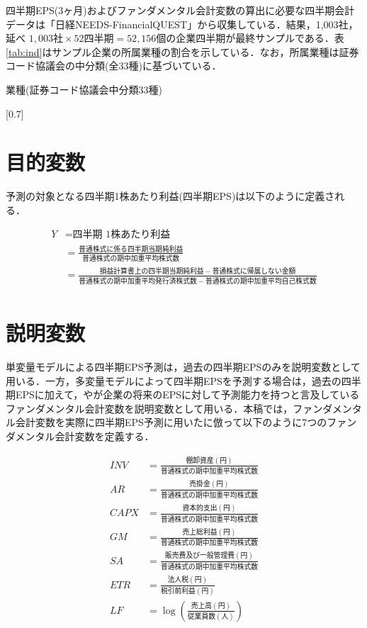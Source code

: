 \documentclass[a4paper，12pt]{jsarticle}
\begin{document}
四半期EPS(3ヶ月)およびファンダメンタル会計変数の算出に必要な四半期会計データは「日経NEEDS-FinancialQUEST」から収集している．結果，1,003社，延べ $1,003社 \times 52四半期 = 52,156個$の企業四半期が最終サンプルである．表\ref{tab:ind}はサンプル企業の所属業種の割合を示している．なお，所属業種は証券コード協議会の中分類(全33種)に基づいている．

\begin{table}
  \centering
  \caption{業種(証券コード協議会中分類33種)}
  \label{tab:ind}
  \scalebox{0.7}[0.7]{
    
  }
\end{table}

\section{目的変数}

予測の対象となる四半期1株あたり利益(四半期EPS)は以下のように定義される．

\begin{equation}
  \begin{split}
    Y &= \text{四半期 1株あたり利益} \\
    &= \frac{普通株式に係る四半期当期純利益}{普通株式の期中加重平均株式数} \\
    &= \frac{損益計算書上の四半期当期純利益-普通株式に帰属しない金額}{普通株式の期中加重平均発行済株式数 - 普通株式の期中加重平均自己株式数} \\  
  \end{split}
\end{equation}

\section{説明変数}

単変量モデルによる四半期EPS予測は，過去の四半期EPSのみを説明変数として用いる．一方，多変量モデルによって四半期EPSを予測する場合は，過去の四半期EPSに加えて，\cite{lev1993fundamental}や\cite{abarbanell1997fundamental}が企業の将来のEPSに対して予測能力を持つと言及しているファンダメンタル会計変数を説明変数として用いる．本稿では，ファンダメンタル会計変数を実際に四半期EPS予測に用いた\cite{zhang2004neural}に倣って以下のように7つのファンダメンタル会計変数を定義する．

\begin{equation}
  \begin{split}
    INV &= \frac{棚卸資産(円)}{普通株式の期中加重平均株式数} \\
    AR &= \frac{売掛金(円)}{普通株式の期中加重平均株式数} \\
    CAPX &= \frac{資本的支出(円)}{普通株式の期中加重平均株式数} \\
    GM &= \frac{売上総利益(円)}{普通株式の期中加重平均株式数} \\
    SA &= \frac{販売費及び一般管理費(円)}{普通株式の期中加重平均株式数} \\
    ETR &= \frac{法人税(円)}{税引前利益(円)} \\
    LF &= \log{\left(\frac{売上高(円)}{従業員数(人)}\right)} \\
  \end{split}
\end{equation}
\end{document}
